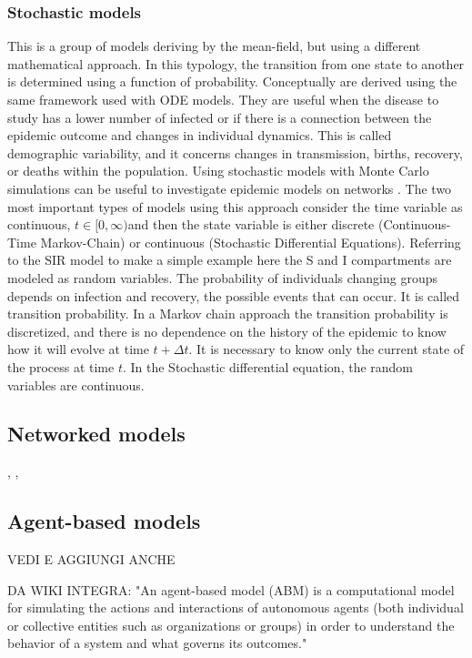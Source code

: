 \subsubsection{Stochastic models} 	
This is a group of models deriving by the mean-field, but using a different mathematical approach.
In this typology, the transition from one state to another is determined using a function of probability.  Conceptually are derived using the same framework used with ODE models. They are useful when the disease to study has a lower number of infected or if there is a connection between the epidemic outcome and changes in individual dynamics. This is called demographic variability, and it concerns changes in transmission, births, recovery, or deaths within the population. Using stochastic models with Monte Carlo simulations can be useful to investigate epidemic models on networks \cite{Allen2017}. 
The two most important types of models using this approach consider the time variable as continuous, $t \in [0, \infty) $and then the state variable is either discrete (Continuous-Time Markov-Chain) or continuous (Stochastic Differential Equations).
Referring to the SIR model to make a simple example here the S and I compartments are modeled as random variables. The probability of individuals changing groups depends on infection and recovery, the possible events that can occur. It is called transition probability. 
In a Markov chain approach the transition probability is discretized, and there is no dependence on the history of the epidemic to know how it will evolve at time $t + \Delta t$. It is necessary to know only the current state of the process at time $t$. 
In the Stochastic differential equation, the random variables are continuous. 

\subsection{Networked models}
\cite{Newman2002}, \cite{VanMieghem2009}, 


\subsection{Agent-based models}

VEDI E AGGIUNGI ANCHE \cite{Tizzoni2014}

DA WIKI INTEGRA: "An agent-based model (ABM) is a computational model for simulating the actions and interactions of autonomous agents (both individual or collective entities such as organizations or groups) in order to understand the behavior of a system and what governs its outcomes."

